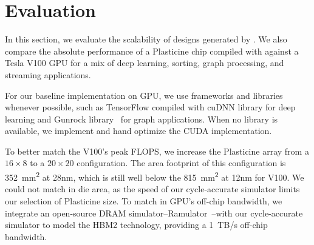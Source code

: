 \section{Evaluation} \label{sec:eval}

In this section, we evaluate the scalability of designs generated by \name.
We also compare the absolute performance of a Plasticine chip compiled with \name against a Tesla V100 GPU 
for a mix of deep learning, sorting, graph processing, and streaming applications.

For our baseline implementation on GPU, we use frameworks and libraries whenever possible, such as TensorFlow compiled
with cuDNN library for deep learning and Gunrock library~\cite{gunrock} for graph applications.
When no library is available, we implement and hand optimize the CUDA implementation.

To better match the V100's peak FLOPS, 
we increase the Plasticine array from a $16\times8$ to a $20\times20$ configuration.
The area footprint of this configuration is \SI{352}{mm^2} at 28nm, which is still well below the 
\SI{815}{mm^2} at 12nm for V100.
We could not match in die area, as the speed of our cycle-accurate simulator limits our selection of Plasticine size.
To match in GPU's off-chip bandwidth, 
we integrate an open-source DRAM simulator--Ramulator~\cite{ramulator}--with our
cycle-accurate simulator to model the HBM2 technology, providing a \SI{1}{TB/s} off-chip bandwidth.

